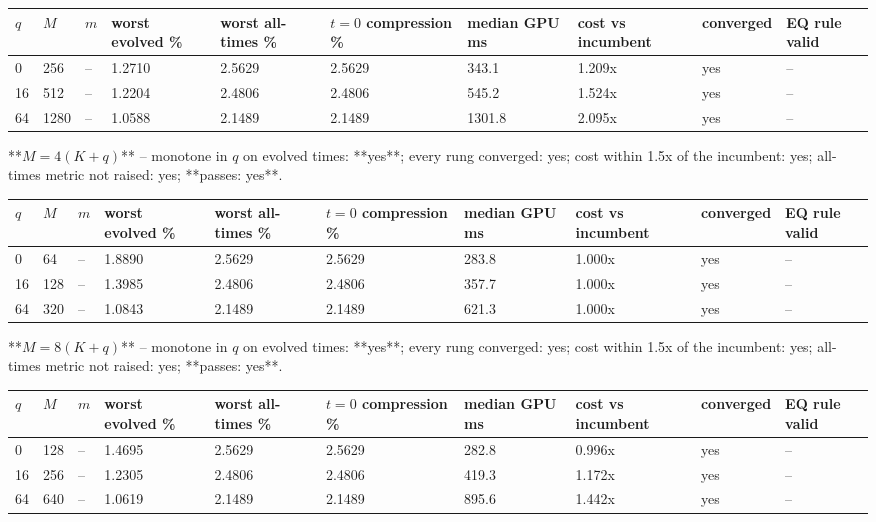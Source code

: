 \documentclass[11pt]{article}
\begin{document}
\begin{table}[htbp]\centering\small
\begin{tabular}{llllllllll}\hline
$q$ & $M$ & $m$ & worst evolved \% & worst all-times \% & $t=0$ compression \% & median GPU ms & cost vs incumbent & converged & EQ rule valid \\ \hline
0 & 256 & -- & 1.2710 & 2.5629 & 2.5629 & 343.1 & 1.209x & yes & -- \\
16 & 512 & -- & 1.2204 & 2.4806 & 2.4806 & 545.2 & 1.524x & yes & -- \\
64 & 1280 & -- & 1.0588 & 2.1489 & 2.1489 & 1301.8 & 2.095x & yes & -- \\
\hline\end{tabular}
\end{table}
**$M = 4(K+q)$** -- monotone in $q$ on evolved times: **yes**; every rung converged: yes; cost within 1.5x of the incumbent: yes; all-times metric not raised: yes; **passes: yes**.

\begin{table}[htbp]\centering\small
\begin{tabular}{llllllllll}\hline
$q$ & $M$ & $m$ & worst evolved \% & worst all-times \% & $t=0$ compression \% & median GPU ms & cost vs incumbent & converged & EQ rule valid \\ \hline
0 & 64 & -- & 1.8890 & 2.5629 & 2.5629 & 283.8 & 1.000x & yes & -- \\
16 & 128 & -- & 1.3985 & 2.4806 & 2.4806 & 357.7 & 1.000x & yes & -- \\
64 & 320 & -- & 1.0843 & 2.1489 & 2.1489 & 621.3 & 1.000x & yes & -- \\
\hline\end{tabular}
\end{table}
**$M = 8(K+q)$** -- monotone in $q$ on evolved times: **yes**; every rung converged: yes; cost within 1.5x of the incumbent: yes; all-times metric not raised: yes; **passes: yes**.

\begin{table}[htbp]\centering\small
\begin{tabular}{llllllllll}\hline
$q$ & $M$ & $m$ & worst evolved \% & worst all-times \% & $t=0$ compression \% & median GPU ms & cost vs incumbent & converged & EQ rule valid \\ \hline
0 & 128 & -- & 1.4695 & 2.5629 & 2.5629 & 282.8 & 0.996x & yes & -- \\
16 & 256 & -- & 1.2305 & 2.4806 & 2.4806 & 419.3 & 1.172x & yes & -- \\
64 & 640 & -- & 1.0619 & 2.1489 & 2.1489 & 895.6 & 1.442x & yes & -- \\
\hline\end{tabular}
\end{table}
\end{document}
